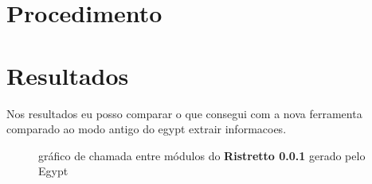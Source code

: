 \section{Procedimento}
\section{Resultados}

Nos resultados eu posso comparar o que consegui com a nova ferramenta comparado ao modo antigo do egypt extrair informacoes.

\begin{figure}[h]
\center
{}
\qquad
{}
\caption{gráfico de chamada entre módulos do {\bf Ristretto 0.0.1} gerado pelo Egypt}
\end{figure}

